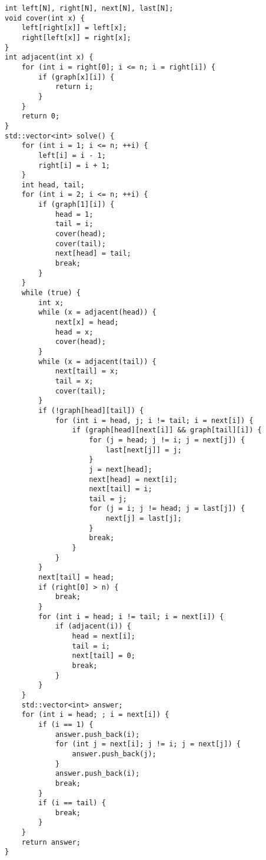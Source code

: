 \begin{lstlisting}
int left[N], right[N], next[N], last[N];
void cover(int x) {
    left[right[x]] = left[x];
    right[left[x]] = right[x];
}
int adjacent(int x) {
    for (int i = right[0]; i <= n; i = right[i]) {
        if (graph[x][i]) {
            return i;
        }
    }
    return 0;
}
std::vector<int> solve() {
    for (int i = 1; i <= n; ++i) {
        left[i] = i - 1;
        right[i] = i + 1;
    }
    int head, tail;
    for (int i = 2; i <= n; ++i) {
        if (graph[1][i]) {
            head = 1;
            tail = i;
            cover(head);
            cover(tail);
            next[head] = tail;
            break;
        }
    }
    while (true) {
        int x;
        while (x = adjacent(head)) {
            next[x] = head;
            head = x;
            cover(head);
        }
        while (x = adjacent(tail)) {
            next[tail] = x;
            tail = x;
            cover(tail);
        }
        if (!graph[head][tail]) {
            for (int i = head, j; i != tail; i = next[i]) {
                if (graph[head][next[i]] && graph[tail][i]) {
                    for (j = head; j != i; j = next[j]) {
                        last[next[j]] = j;
                    }
                    j = next[head];
                    next[head] = next[i];
                    next[tail] = i;
                    tail = j;
                    for (j = i; j != head; j = last[j]) {
                        next[j] = last[j];
                    }
                    break;
                }
            }
        }
        next[tail] = head;
        if (right[0] > n) {
            break;
        }
        for (int i = head; i != tail; i = next[i]) {
            if (adjacent(i)) {
                head = next[i];
                tail = i;
                next[tail] = 0;
                break;
            }
        }
    }
    std::vector<int> answer;
    for (int i = head; ; i = next[i]) {
        if (i == 1) {
            answer.push_back(i);
            for (int j = next[i]; j != i; j = next[j]) {
                answer.push_back(j);
            }
            answer.push_back(i);
            break;
        }
        if (i == tail) {
            break;
        }
    }
    return answer;
}
\end{lstlisting}
